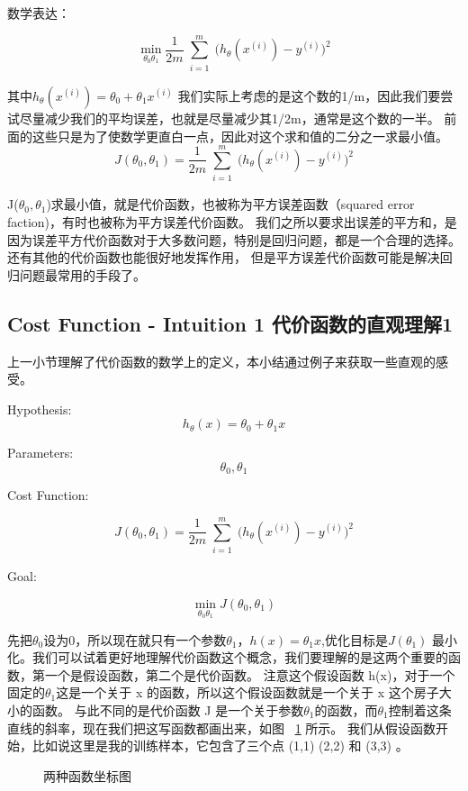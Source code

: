 \documentclass[UTF8]{ctexart}
\begin{document}
数学表达：

\begin{equation*}
  \min_{\theta_0 \theta_1}
  \frac{1}{2m}
  \sum^m_{\substack{i=1}}
   \Big(h_\theta(x^{(i)})-y^{(i)}\Big)^{2}
\end{equation*}

其中$h_\theta(x^{(i)})=\theta_0+\theta_1x^{(i)}$
我们实际上考虑的是这个数的1/m，因此我们要尝试尽量减少我们的平均误差，也就是尽量减少其1/2m，通常是这个数的一半。
前面的这些只是为了使数学更直白一点，因此对这个求和值的二分之一求最小值。
\begin{equation*}
  J(\theta_0,\theta_1)=
  \frac{1}{2m}
  \sum^m_{\substack{i=1}}
   \Big(h_\theta(x^{(i)})-y^{(i)}\Big)^{2}
\end{equation*}

J($\theta_0,\theta_1$)求最小值，就是代价函数，也被称为平方误差函数（squared error faction)，有时也被称为平方误差代价函数。
我们之所以要求出误差的平方和，是因为误差平方代价函数对于大多数问题，特别是回归问题，都是一个合理的选择。还有其他的代价函数也能很好地发挥作用，
但是平方误差代价函数可能是解决回归问题最常用的手段了。

\subsection{Cost Function - Intuition 1 代价函数的直观理解1}
上一小节理解了代价函数的数学上的定义，本小结通过例子来获取一些直观的感受。
\newline

Hypothesis:
\begin{equation*}
    h_\theta(x)=\theta_0+\theta_1x
\end{equation*}

 Parameters:
\begin{equation*}
\theta_0,\theta_1
\end{equation*}

Cost Function:

\begin{equation*}
  J(\theta_0,\theta_1)=
  \frac{1}{2m}
  \sum^m_{\substack{i=1}}
   \Big(h_\theta(x^{(i)})-y^{(i)}\Big)^{2}
\end{equation*}

Goal:

\begin{equation*}
  \min_{\theta_0 \theta_1}
  J(\theta_0,\theta_1)
\end{equation*}

先把$\theta_0$设为0，所以现在就只有一个参数$\theta_1$，$h(x)=\theta_1x$,优化目标是$J(\theta_1)$
最小化。我们可以试着更好地理解代价函数这个概念，我们要理解的是这两个重要的函数，第一个是假设函数，第二个是代价函数。
注意这个假设函数 h(x)，对于一个固定的$\theta_1$这是一个关于 x 的函数，所以这个假设函数就是一个关于 x 这个房子大小的函数。
与此不同的是代价函数 J 是一个关于参数$\theta_1$的函数，而$\theta_1$控制着这条直线的斜率，现在我们把这写函数都画出来，如图 ~\ref{fig:3} 所示。
我们从假设函数开始，比如说这里是我的训练样本，它包含了三个点 (1,1) (2,2) 和 (3,3) 。
\begin{figure}[htb]
 \caption{两种函数坐标图}
 \label{fig:3}
\end{figure}
\end{document}
